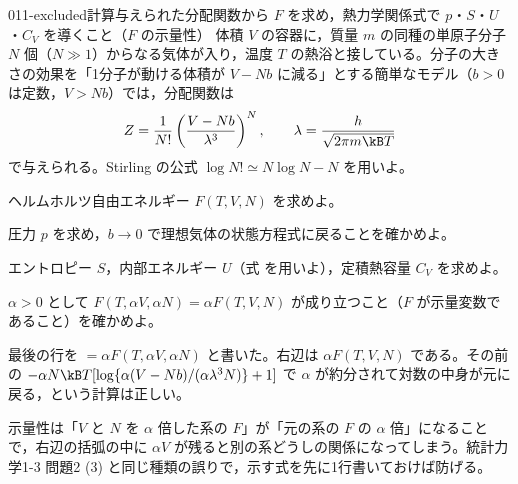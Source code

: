 \documentclass[uplatex,dvipdfmx,a4paper,11pt]{jsarticle}
\begin{document}
\begin{mondai}{011-excluded}{計算}{与えられた分配関数から $F$ を求め，熱力学関係式で $p$・$S$・$U$・$C_{V}$ を導くこと（$F$ の示量性）}
体積 $V$ の容器に，質量 $m$ の同種の単原子分子 $N$ 個（$N\gg1$）からなる気体が入り，温度 $T$ の熱浴と接している。分子の大きさの効果を「1分子が動ける体積が $V-Nb$ に減る」とする簡単なモデル（$b>0$ は定数，$V>Nb$）では，分配関数は
\[Z=\frac{1}{N!}\left(\frac{V-Nb}{\lambda^{3}}\right)^{N},\qquad\lambda=\frac{h}{\sqrt{2\pi m\kB T}}\]
で与えられる。Stirling の公式 $\log N!\simeq N\log N-N$ を用いよ。
\begin{shoumon}
  \item ヘルムホルツ自由エネルギー $F(T,V,N)$ を求めよ。
  \item 圧力 $p$ を求め，$b\to0$ で理想気体の状態方程式に戻ることを確かめよ。
  \item エントロピー $S$，内部エネルギー $U$（式 を用いよ），定積熱容量 $C_{V}$ を求めよ。
  \item $\alpha>0$ として $F(T,\alpha V,\alpha N)=\alpha F(T,V,N)$ が成り立つこと（$F$ が示量変数であること）を確かめよ。
\end{shoumon}

\begin{kotaeran}
   最後の行を $=\alpha F(T,\alpha V,\alpha N)$ と書いた。右辺は $\alpha F(T,V,N)$ である。その前の $-\alpha N\kB T[\log\{\alpha(V-Nb)/(\alpha\lambda^{3}N)\}+1]$ で $\alpha$ が約分されて対数の中身が元に戻る，という計算は正しい。
\end{kotaeran}
\begin{rikai}
  \item 示量性は「$V$ と $N$ を $\alpha$ 倍した系の $F$」が「元の系の $F$ の $\alpha$ 倍」になることで，右辺の括弧の中に $\alpha V$ が残ると別の系どうしの関係になってしまう。統計力学1-3 問題2 (3) と同じ種類の誤りで，示す式を先に1行書いておけば防げる。
\end{rikai}
\end{mondai}
\end{document}
